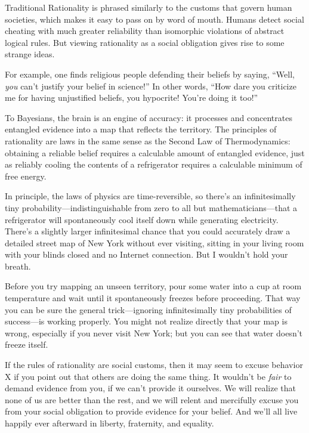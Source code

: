 {
 Traditional Rationality is phrased similarly to the customs that
govern human societies, which makes it easy to pass on by word of
mouth. Humans detect social cheating with much greater reliability than
isomorphic violations of abstract logical rules. But viewing
rationality as a social obligation gives rise to some strange ideas.}

{
 For example, one finds religious people defending their beliefs by
saying, ``Well, \textit{you} can't
justify your belief in science!'' In other words,
``How dare you criticize me for having unjustified
beliefs, you hypocrite! You're doing it
too!''}

{
 To Bayesians, the brain is an engine of accuracy: it processes and
concentrates entangled evidence into a map that reflects the territory.
The principles of rationality are laws in the same sense as the Second
Law of Thermodynamics: obtaining a reliable belief requires a
calculable amount of entangled evidence, just as reliably cooling the
contents of a refrigerator requires a calculable minimum of free
energy.}

{
 In principle, the laws of physics are time-reversible, so
there's an infinitesimally tiny
probability---indistinguishable from zero to all but
mathematicians---that a refrigerator will spontaneously cool itself
down while generating electricity. There's a slightly
larger infinitesimal chance that you could accurately draw a detailed
street map of New York without ever visiting, sitting in your living
room with your blinds closed and no Internet connection. But I
wouldn't hold your breath.}

{
 Before you try mapping an unseen territory, pour some water into a
cup at room temperature and wait until it spontaneously freezes before
proceeding. That way you can be sure the general trick---ignoring
infinitesimally tiny probabilities of success---is working properly.
You might not realize directly that your map is wrong, especially if
you never visit New York; but you can see that water
doesn't freeze itself.}

{
 If the rules of rationality are social customs, then it may seem
to excuse behavior X if you point out that others are doing the same
thing. It wouldn't be \textit{fair} to demand evidence
from you, if we can't provide it ourselves. We will
realize that none of us are better than the rest, and we will relent
and mercifully excuse you from your social obligation to provide
evidence for your belief. And we'll all live happily
ever afterward in liberty, fraternity, and equality.}

